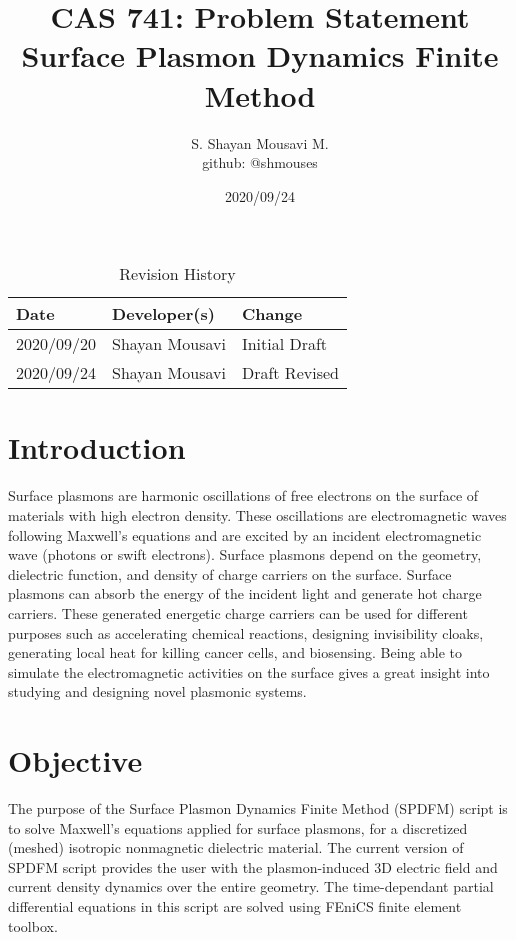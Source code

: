 \documentclass{article} \usepackage{tabularx} \usepackage{booktabs}
\title{CAS 741: Problem Statement\\Surface Plasmon Dynamics Finite Method}
\author{S. Shayan Mousavi M.\\github: @shmouses}
\date{2020/09/24}
\begin{document}
	
	\maketitle \clearpage
	
	
	\begin{table}[hp] \caption{Revision History} \label{TblRevisionHistory}
		\begin{tabularx}{\textwidth}{llX} \toprule \textbf{Date} &
			\textbf{Developer(s)} & \textbf{Change}\\ \midrule 2020/09/20 & Shayan Mousavi
			& Initial Draft\\ 2020/09/24 & Shayan Mousavi & Draft Revised\\ \bottomrule
	\end{tabularx} \end{table}
	
	
	
	\clearpage
	
	
	\newpage
	
	
	\newcommand*\apos{\textsc{\char13}} \section{Introduction}
	
	Surface plasmons are harmonic oscillations of free electrons on the surface of
	materials with high electron density. These oscillations are electromagnetic
	waves following Maxwell's equations and are excited by an incident
	electromagnetic wave (photons or swift electrons). Surface plasmons depend on
	the geometry, dielectric function, and density of charge carriers on the
	surface. Surface plasmons can absorb the energy of the incident light and
	generate hot charge carriers. These generated energetic charge carriers can be
	used for different purposes such as accelerating chemical reactions, designing
	invisibility cloaks, generating local heat for killing cancer cells, and
	biosensing. Being able to simulate the electromagnetic activities on the
	surface gives a great insight into studying and designing novel plasmonic
	systems.
	
	
	\section{Objective}
	
	The purpose of the Surface Plasmon Dynamics Finite Method (SPDFM) script is to
	solve Maxwell's equations applied for surface plasmons, for a
	discretized (meshed) isotropic nonmagnetic dielectric material. The current version
	 of SPDFM script provides the user with the plasmon-induced 3D electric field and current density dynamics over the entire geometry. The
	time-dependant partial differential equations in this script are solved using
	FEniCS finite element toolbox.
	
\end{document}
